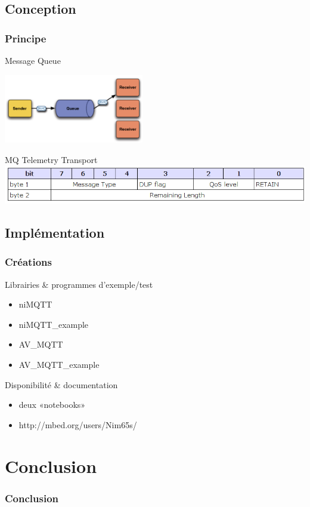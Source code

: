 \documentclass[slidetop,11pt]{beamer}
\begin{document}
\subsection{Conception}
\begin{frame}
    \frametitle{Principe}
    \begin{block}{Message Queue}
        \begin{center}
            \includegraphics[height=3cm]{img/mq.png}
        \end{center}
    \end{block}
    \begin{block}{MQ Telemetry Transport}
        \includegraphics[width=\linewidth]{img/MQTT_header.png}
    \end{block}
\end{frame}

\subsection{Implémentation}
\begin{frame}
    \frametitle{Créations}
    \begin{block}{Librairies \& programmes d’exemple/test}
        \begin{itemize}
            \item niMQTT
            \item niMQTT\_example
            \item AV\_MQTT
            \item AV\_MQTT\_example
        \end{itemize}
    \end{block}
    \begin{block}{Disponibilité \& documentation}
        \begin{itemize}
            \item deux «notebooks»
            \item http://mbed.org/users/Nim65s/
        \end{itemize}
    \end{block}
\end{frame}

\section{Conclusion}

\begin{frame}
    \frametitle{Conclusion}
\end{frame}
\end{document}
